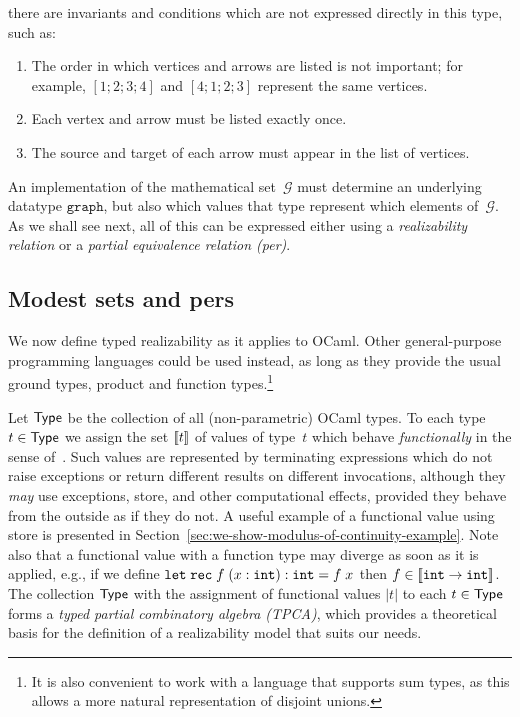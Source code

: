 there are invariants and conditions which are not expressed directly
in this type, such as:
%
\begin{enumerate}
\item The order in which vertices and arrows are listed is not
  important; for example, $[1;2;3;4]$ and $[4;1;2;3]$ represent the same vertices.
\item Each vertex and arrow must be listed exactly once.
\item The source and target of each arrow must appear in the list of vertices.
\end{enumerate}
%
An implementation of the mathematical set~$\mathcal{G}$ must determine
an underlying datatype $\mathtt{graph}$, but also
which values that type represent which elements
of~$\mathcal{G}$. As we shall see next, all of this can be expressed
either using a \emph{realizability relation} or a \emph{partial
  equivalence relation (per)}.

\subsection{Modest sets and pers}
\label{sec:modest-sets-pers}

We now define typed realizability as it
applies to OCaml. Other general-purpose programming languages could be
used instead, as long as they provide the usual ground types, product
and function types.\footnote{It is also convenient to work with a
language that supports sum types, as this allows a more natural
representation of disjoint unions.}

Let $\mathsf{Type}$ be the collection of all (non-parametric) OCaml types. To
each type $t \in \mathsf{Type}$ we assign the set $[\![t]\!]$ of values of
type~$t$ which behave \emph{functionally} in the sense
of~\cite{longley99when}. Such values are represented by terminating
expressions which do not raise exceptions or return different results
on different invocations, although they \emph{may} use exceptions,
store, and other computational effects, provided they behave from the outside
as if they do not. A useful example of a functional value using store is
presented in Section~\ref{sec:we-show-modulus-of-continuity-example}.
Note also that a functional value with a function type may diverge as
soon as it is applied, e.g., if we define
$\mathtt{let}\;\mathtt{rec}\;f\;(x:\mathtt{int}):\mathtt{int} = f\;x$ then $f \in [\![\mathtt{int} \to
  \mathtt{int}]\!]$. The collection $\mathsf{Type}$ with the assignment of functional
values $|t|$ to each $t \in \mathsf{Type}$ forms a \emph{typed partial
  combinatory algebra (TPCA)}, which provides a theoretical basis for
the definition of a realizability model that suits our needs.

